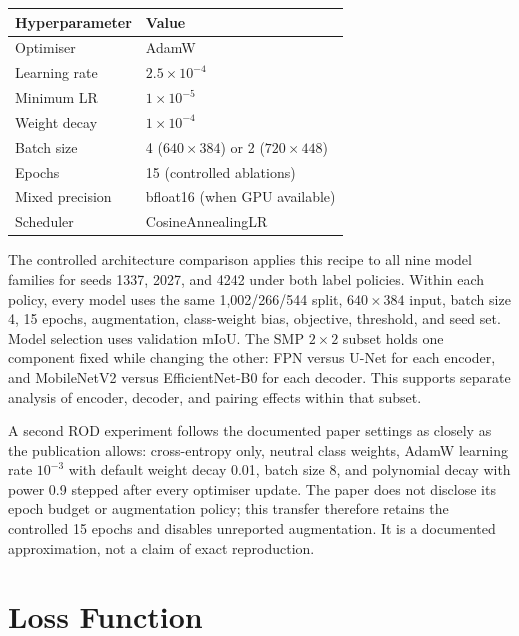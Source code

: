 \documentclass[12pt,a4paper]{report}
\begin{document}
\begin{center}
\small
\begin{tabular}{@{}ll@{}}
\toprule
\textbf{Hyperparameter} & \textbf{Value} \\
\midrule
Optimiser         & AdamW \\
Learning rate     & $2.5 \times 10^{-4}$ \\
Minimum LR        & $1 \times 10^{-5}$ \\
Weight decay      & $1 \times 10^{-4}$ \\
Batch size        & 4 ($640\times384$) or 2 ($720\times448$) \\
Epochs            & 15 (controlled ablations) \\
Mixed precision   & bfloat16 (when GPU available) \\
Scheduler         & CosineAnnealingLR \\
\bottomrule
\end{tabular}
\end{center}

The controlled architecture comparison applies this recipe to all nine model
families for seeds 1337, 2027, and 4242 under both label policies. Within each
policy, every model uses the same 1,002/266/544 split, $640\times384$ input,
batch size 4, 15 epochs, augmentation, class-weight bias, objective, threshold,
and seed set. Model selection uses validation mIoU. The SMP $2\times2$ subset
holds one component fixed while changing the other: FPN versus U-Net for each
encoder, and MobileNetV2 versus EfficientNet-B0 for each decoder. This supports
separate analysis of encoder, decoder, and pairing effects within that subset.

A second ROD
experiment follows the documented paper settings as closely as the publication
allows: cross-entropy only, neutral class weights, AdamW learning rate
$10^{-3}$ with default weight decay 0.01, batch size 8, and polynomial decay
with power 0.9 stepped after every optimiser update. The paper does not disclose
its epoch budget or augmentation policy; this transfer therefore retains the
controlled 15 epochs and disables unreported augmentation. It is a documented
approximation, not a claim of exact reproduction.

\section{Loss Function}
\end{document}
